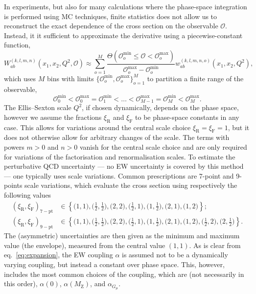 In experiments, but also for many calculations where the phase-space integration is performed using MC techniques, finite statistics does not allow us to reconstruct the exact dependence of the cross section on the observable $\mathcal{O}$.
Instead, it it sufficient to approximate the derivative using a piecewise-constant function,
\begin{equation}
W_{ab}^{(k,l,m,n)} \left( x_1, x_2, Q^2, \mathcal{O} \right) \approx \sum_{o=1}^M \frac{\Theta (\mathcal{O}_o^\mathrm{min} \le \mathcal{O} < \mathcal{O}_o^\mathrm{max})}{\mathcal{O}_o^\mathrm{max} - \mathcal{O}_o^\mathrm{min}} w_{ab}^{(k,l,m,n,o)} \left( x_1, x_2, Q^2 \right) \text{,}
\end{equation}
which uses $M$ bins with limits $\{ \mathcal{O}_o^\mathrm{min}, \mathcal{O}_o^\mathrm{max} \}_{o=1}^M$ to partition a finite range of the observable,
\begin{equation}
\mathcal{O}_0^\mathrm{min} < \mathcal{O}_0^\mathrm{max} = \mathcal{O}_1^\mathrm{min} < \ldots < \mathcal{O}_{M-1}^\mathrm{max} = \mathcal{O}_M^\mathrm{min} < \mathcal{O}_M^\mathrm{max} \text{.}
\label{eq:bins-of-diff-xsection}
\end{equation}
The Ellis--Sexton scale $Q^2$, if chosen dynamically, depends on the phase space, however we assume the fractions $\xi_\mathrm{R}$ and $\xi_\mathrm{F}$ to be  phase-space constants in any case.
This allows for variations around the central scale choice $\xi_\mathrm{R} = \xi_\mathrm{F} = 1$, but it does not otherwise allow for arbitrary changes of the scale.
The terms with powers $m > 0$ and $n > 0$ vanish for the central scale choice and are only required for variations of the factorisation and renormalisation scales.
To estimate the perturbative QCD uncertainty --- no EW uncertainty is covered by this method --- one typically uses scale variations. Common prescriptions are
7-point and 9-points scale variations, which evaluate the cross section using
respectively the following values
  \begin{align}
    (\xi_\mathrm{R}, \xi_\mathrm{F})_{\mathrm{7-pt}}
    & \in
    \left\{ \bigl( 1, 1 \bigr), \bigl( \tfrac{1}{2}, \tfrac{1}{2} \bigr), \bigl( 2, 2 \bigr), \bigl( \tfrac{1}{2}, 1 \bigr), \bigl( 1, \tfrac{1}{2} \bigr), \bigl( 2, 1 \bigr), \bigl( 1, 2 \bigr) \right\} \text{;}
    \label{eq:7pt}\\
    (\xi_\mathrm{R}, \xi_\mathrm{F})_{\mathrm{9-pt}}
    & \in
    \left\{ \bigl( 1, 1 \bigr), \bigl( \tfrac{1}{2}, \tfrac{1}{2} \bigr), \bigl( 2, 2 \bigr), \bigl( \tfrac{1}{2}, 1 \bigr), \bigl( 1, \tfrac{1}{2} \bigr), \bigl( 2, 1 \bigr), \bigl( 1, 2 \bigr), \bigl( \tfrac{1}{2}, 2 \bigr), \bigl(2, \tfrac{1}{2} \bigr) \right\}  \text{.}
    \label{eq:9pt}
   \end{align}
The (asymmetric) uncertainties are then given as the minimum and maximum value (the envelope), measured from the central value $(1, 1)$.
As is clear from eq.~\eqref{eq:expansion}, the EW coupling $\alpha$ is assumed not to be a dynamically varying coupling, but instead a constant over phase space.
This, however, includes the most common choices of the coupling, which are (not necessarily in this order), $\alpha (0)$, $\alpha (M_\mathrm{Z})$, and $\alpha_{G_\mu}$.

